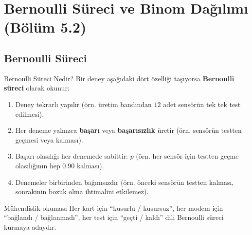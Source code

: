 \documentclass[light]{lutbeamer}
\begin{document}
\section{Bernoulli Süreci ve Binom Dağılımı (Bölüm 5.2)}
\subsection{Bernoulli Süreci}

\begin{frame}{Bernoulli Süreci Nedir?}
    \small
    Bir deney aşağıdaki dört özelliği taşıyorsa \textbf{Bernoulli süreci} olarak okunur:
    \begin{enumerate}
        \item Deney tekrarlı yapılır (örn. üretim bandından \(12\) adet sensörün tek tek test edilmesi).
        \item Her deneme yalnızca \textbf{başarı} veya \textbf{başarısızlık} üretir (örn. sensörün testten geçmesi veya kalması).
        \item Başarı olasılığı her denemede sabittir: \(p\) (örn. her sensör için testten geçme olasılığının hep \(0.90\) kalması).
        \item Denemeler birbirinden bağımsızdır (örn. önceki sensörün testten kalması, sonrakinin bozuk olma ihtimalini etkilemez).
    \end{enumerate}

    \begin{exampleblock}{Mühendislik okuması}
        Her kart için ``kusurlu / kusursuz'', her modem için ``bağlandı / bağlanmadı'', her test için ``geçti / kaldı'' dili Bernoulli süreci kurmaya adaydır.
    \end{exampleblock}
\end{frame}
\end{document}
